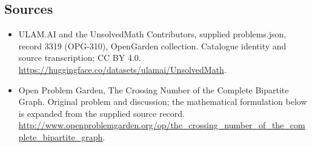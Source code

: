 \documentclass[11pt,a4paper]{article}
\begin{document}
\subsection{Sources}
\begin{itemize}
\item[S1] ULAM.AI and the UnsolvedMath Contributors, supplied problems.json, record 3319 (OPG-310), OpenGarden collection. Catalogue identity and source transcription; CC BY 4.0.
\url{https://huggingface.co/datasets/ulamai/UnsolvedMath}.
\item[S2] Open Problem Garden, The Crossing Number of the Complete Bipartite Graph. Original problem and discussion; the mathematical formulation below is expanded from the supplied source record.
\url{http://www.openproblemgarden.org/op/the_crossing_number_of_the_complete_bipartite_graph}.

\end{itemize}
\end{document}
